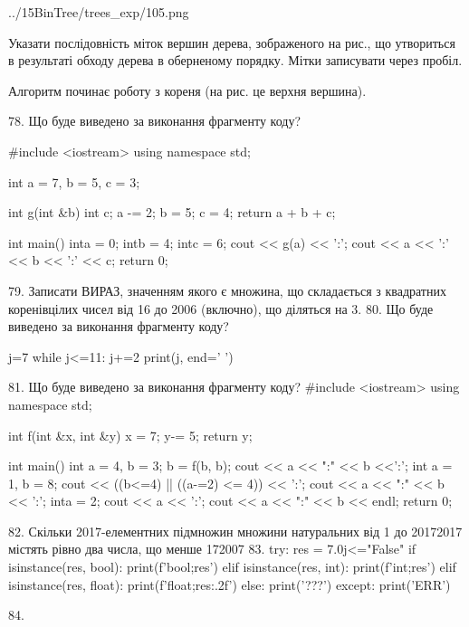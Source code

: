 \documentclass[11pt]{article}
\begin{document}
\begin{center}
	{../15BinTree/trees_exp/105.png}
\end{center}
Указати послідовність міток вершин дерева, зображеного на рис., що утвориться в результаті обходу дерева в оберненому порядку. Мітки записувати через пробіл.\par Алгоритм починає роботу з кореня (на рис. це верхня вершина).

78. Що буде виведено за виконання фрагменту коду?

#include <iostream>
using namespace std;

int a = 7, b = 5, c = 3;

int g(int &b){
int c;    a -= 2;
    b = 5;
    c = 4;
    return a + b + c;
}

int main(){
    inta = 0;
    intb = 4;
    intc = 6;
    cout << g(a) << ':';
    cout << a << ':' << b << ':' << c;
    return 0; 
}

79. 
Записати ВИРАЗ, значенням якого є множина, що складається з квадратних коренівцілих чисел від 16 до 2006 (включно), що діляться на 3.
80. Що буде виведено за виконання фрагменту коду?

j=7
while j<=11:
    j+=2
print(j, end=' ')


81. Що буде виведено за виконання фрагменту коду?
#include <iostream>
using namespace std;

int f(int &x, int &y){
    x = 7;
    y-= 5;
    return y;
}

int main(){
    int a = 4, b = 3;
    b = f(b, b);
    cout << a << ":" << b <<':';
    {
        int a = 1, b = 8;
        cout << ((b<=4) || ((a-=2) <= 4)) << ':';
        cout << a << ":" << b << ':';
    }
    {
        inta = 2;
        cout << a << ':';
    }
    cout << a << ":" << b << endl;
    return 0;
}


82. 
Скільки 2017-елементних підмножин множини натуральних від 1 до 20172017 містять рівно два числа, що менше 172007
83. 
try:
    res = 7.0j<="False"
    if isinstance(res, bool):
        print(f'bool;{res}')
    elif isinstance(res, int):
        print(f'int;{res}')
    elif isinstance(res, float):
        print(f'float;{res:.2f}')
    else:
        print('???')
except:
    print('ERR')

84. 
\end{document}

